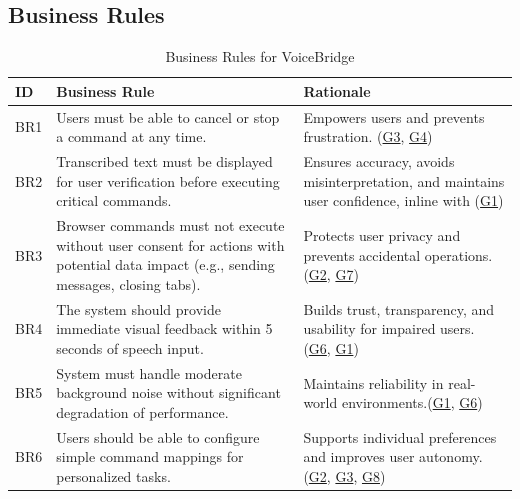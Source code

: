 \documentclass[11pt]{article}
\begin{document}
\subsection{Business Rules}

\begin{table}[H]
\centering
\begin{tabularx}{\textwidth}{p{1cm} X X}
\toprule
\textbf{ID} & \textbf{Business Rule} & \textbf{Rationale} \\
\midrule
BR1 & Users must be able to cancel or stop a command at any time. & Empowers users and prevents frustration. (\hyperref[tab:project-goals]{G3}, \hyperref[tab:project-goals]{G4}) \\
BR2 & Transcribed text must be displayed for user verification before executing critical commands. & Ensures accuracy, avoids misinterpretation, and maintains user confidence, inline with (\hyperref[tab:project-goals]{G1}) \\
BR3 & Browser commands must not execute without user consent for actions with potential data impact (e.g., sending messages, closing tabs). & Protects user privacy and prevents accidental operations. (\hyperref[tab:project-goals]{G2}, \hyperref[tab:project-goals]{G7}) \\
BR4 & The system should provide immediate visual feedback within 5 seconds of speech input. & Builds trust, transparency, and usability for impaired users. (\hyperref[tab:project-goals]{G6}, \hyperref[tab:project-goals]{G1}) \\
BR5 & System must handle moderate background noise without significant degradation of performance. & Maintains reliability in real-world environments.(\hyperref[tab:project-goals]{G1}, \hyperref[tab:project-goals]{G6}) \\
BR6 & Users should be able to configure simple command mappings for personalized tasks. & Supports individual preferences and improves user autonomy. (\hyperref[tab:project-goals]{G2}, \hyperref[tab:project-goals]{G3}, \hyperref[tab:project-goals]{G8}) \\
\bottomrule
\end{tabularx}
\caption{Business Rules for VoiceBridge}
\label{tab:business-rules}
\end{table}
\end{document}
